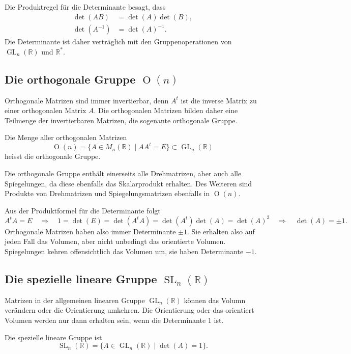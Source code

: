 Die Produktregel für die Determinante besagt, dass 
\begin{align*}
\det(AB)&=\det(A)\det(B),
\\
\det(A^{-1})&=\det(A)^{-1}.
\end{align*}
Die Determinante ist daher verträglich mit den Gruppenoperationen
von $\operatorname{GL}_n(\mathbb R)$ und $\mathbb R^*$.

%
%
\subsection{Die orthogonale Gruppe $\operatorname{O}(n)$
\label{subsection:orthogonale gruppe}}
Orthogonale Matrizen sind immer invertierbar, denn $A^t$ ist die 
inverse Matrix zu einer orthogonalen Matrix $A$.
Die orthogonalen Matrizen bilden daher eine Teilmenge der invertierbaren
Matrizen, die sogenante orthogonale Gruppe.

\begin{definition}
Die Menge aller orthogonalen Matrizen
\[
\operatorname{O}(n) = \{ A\in M_n(\mathbb R)\;|\; AA^t = E \}
\subset \operatorname{GL}_n(\mathbb R)
\]
heisst die orthogonale Gruppe.
\end{definition}
Die orthogonale Gruppe enthält einerseits alle Drehmatrizen, aber auch
alle Spiegelungen, da diese ebenfalls das Skalarprodukt erhalten.
Des Weiteren sind Produkte von Drehmatrizen und Spiegelungsmatrizen
ebenfalls in $\operatorname{O}(n)$.

Aus der Produktformel für die Determinante folgt
\[
A^tA=E
\quad\Rightarrow\quad
1
=
\det(E)
=
\det(A^tA)
=
\det(A^t)\det(A)
=
\det(A)^2
\quad\Rightarrow\quad
\det(A)=\pm 1.
\]
Orthogonale Matrizen haben also immer Determinante $\pm 1$.
Sie erhalten
also auf jeden Fall das Volumen, aber nicht unbedingt das orientierte
Volumen.
Spiegelungen kehren offensichtlich das Volumen um, sie haben Determinante
$-1$.

%
%
\subsection{Die spezielle lineare Gruppe $\operatorname{SL}_n(\mathbb R)$}
Matrizen in der allgemeinen linearen Gruppe $\operatorname{GL}_n(\mathbb R)$
können das Volumn verändern oder die Orientierung umkehren.
Die Orientierung oder das orientiert Volumen werden nur dann erhalten
sein, wenn die Determinante $1$ ist.

\begin{definition}
Die spezielle lineare Gruppe ist
\[
\operatorname{SL}_n(\mathbb R)
=
\{ A\in\operatorname{GL}_n(\mathbb R) \;|\; \det (A)=1\}.
\]
\end{definition}

